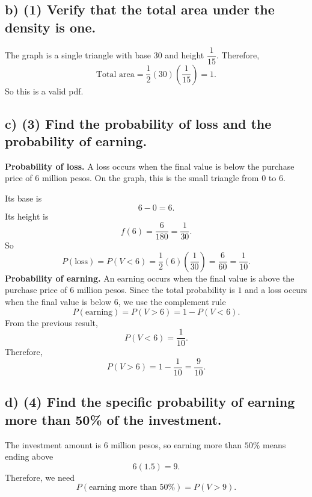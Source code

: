
\subsection*{b) \textbf{(1)} Verify that the total area under the density is one.}
\label{subsec:small-business-investment-c3-b}
The graph is a single triangle with base $30$ and height $\dfrac{1}{15}$. Therefore,
\[
\text{Total area}=\frac12(30)\left(\frac{1}{15}\right)=1.
\]
So this is a valid pdf.


\subsection*{c) \textbf{(3)} Find the probability of loss and the probability of earning.}
\label{subsec:small-business-investment-c3-c}
\textbf{Probability of loss.} A loss occurs when the final value is below the purchase price of $6$ million pesos. On the graph, this is the small triangle from $0$ to $6$.
	
	Its base is
	\[
	6-0=6.
	\]
	Its height is
	\[
	f(6)=\frac{6}{180}=\frac{1}{30}.
	\]
	So
	\[
	P(\text{loss})=P(V<6)=\frac12(6)\left(\frac{1}{30}\right)=\frac{6}{60}=\frac{1}{10}.
	\]
\textbf{Probability of earning.}
An earning occurs when the final value is above the purchase price of $6$ million pesos. Since the total probability is $1$ and a loss occurs when the final value is below $6$, we use the complement rule
\[
P(\text{earning})=P(V>6)=1-P(V<6).
\]
From the previous result,
\[
P(V<6)=\frac{1}{10}.
\]
Therefore,
\[
P(V>6)=1-\frac{1}{10}=\frac{9}{10}.
\]


\subsection*{d) \textbf{(4)} Find the specific probability of earning more than 50\% of the investment.}
\label{subsec:small-business-investment-c3-d}
The investment amount is $6$ million pesos, so earning more than $50\%$ means ending above
\[
6(1.5)=9.
\]
Therefore, we need
\[
P(\text{earning more than }50\%)=P(V>9).
\]

